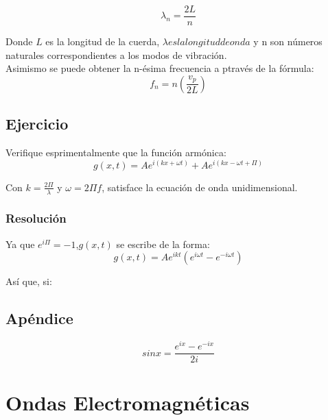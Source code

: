 \documentclass[]{article}
\begin{document}
\begin{equation}
\lambda_n=\frac{2 L}{n}
\end{equation}

Donde $L$ es la longitud de la cuerda, $\lambda es la longitud de onda$ y n son números naturales correspondientes a los modos de vibración.\\

Asimismo se puede obtener la n-ésima frecuencia a ptravés de la fórmula:\\

\begin{equation}
f_n=n(\frac{v_p}{2L})
\end{equation}

\subsection{Ejercicio}

Verifique esprimentalmente que la función armónica:\\

\begin{equation}
g(x,t)=Ae^{i(kx+\omega t)}+Ae^{i(kx-\omega t+\Pi)}
\end{equation}

Con $k=\frac{2 \Pi}{\lambda}$ y $\omega=2 \Pi f$, satisface la ecuación de onda unidimensional.

\subsubsection{Resolución}

Ya que $e^{i\Pi}=-1$,$g(x,t)$ se escribe de la forma:\\

\begin{equation}
g(x,t)=Ae^{ikt}(e^{i \omega t}-e^{-i \omega t})
\end{equation}

Así que, si:\\

\subsection{Apéndice}


\begin{equation}
sin x=\frac{e^{ix}-e^{-ix}}{2i}
\end{equation}

\section{Ondas Electromagnéticas}
\end{document}
